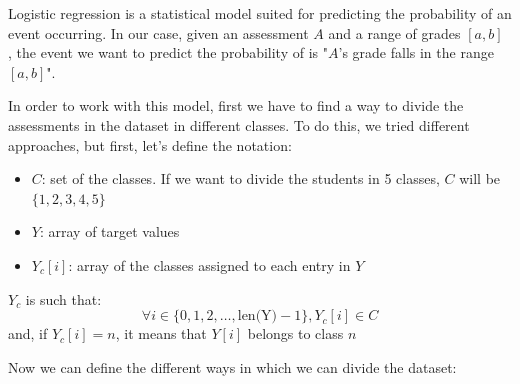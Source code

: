 \documentclass{article}
\begin{document}
Logistic regression is a statistical model suited for predicting the probability of an event occurring. In our case, given an assessment $A$ and a range of grades $[a,b]$ , the event we want to predict the probability of is "$A$'s grade falls in the range $[a,b]$". 

In order to work with this model, first we have to find a way to divide the assessments in the dataset in different classes. To do this, we tried different approaches, but first, let's define the notation:
\begin{itemize}
\item[] $C$: set of the classes. If we want to divide the students in 5 classes, $C$ will be $\{1,2,3,4,5\}$

\item[] $Y$: array of target values

\item[] $Y_c[i]$: array of the classes assigned to each entry in $Y$

\end{itemize}

$Y_c$ is such that:
$$
\forall i \in \{0, 1, 2, \ldots, \text{{len(Y)}}-1\}, Y_c[i] \in C
$$
and, if $Y_c[i] = n$, it means that $Y[i]$ belongs to class $n$

Now we can define the different ways in which we can divide the dataset:
\end{document}
